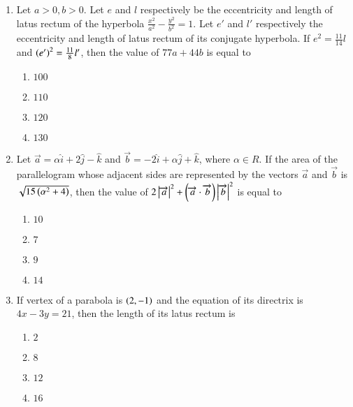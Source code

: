 \documentclass[journal]{IEEEtran}
\begin{document}
\begin{enumerate}
    \item Let $a>0, b>0$. Let $e$ and $l$ respectively be the eccentricity and length of latus rectum of the hyperbola $\frac{x^2}{a^2}-\frac{y^2}{b^2}=1$. Let $e'$ and $l'$ respectively the eccentricity and length of latus rectum of its conjugate hyperbola. If $e^2=\frac{11}{14}l$ and $\left(e'\right)^2=\frac{11}{8}l'$, then the value of $77a+44b$ is equal to

        \begin{multicols}{4}
            \begin{enumerate}
                \item $100$
                \item $110$
                \item $120$
                \item $130$
            \end{enumerate}
        \end{multicols}

    \item Let $\overrightarrow{a}=\alpha \hat{i}+2\hat{j}-\hat{k}$ and $\overrightarrow{b}=-2\hat{i}+\alpha\hat{j}+\hat{k}$, where $\alpha\in R$. If the area of the parallelogram whose adjacent sides are represented by the vectors $\overrightarrow{a}$ and $\overrightarrow{b}$ is $\sqrt{15\left(\alpha^2+4\right)}$, then the value of $2\left\vert\overrightarrow{a}\right\vert^2+\left(\overrightarrow{a}\cdot\overrightarrow{b}\right)\left\vert\overrightarrow{b}\right\vert^2$ is equal to

        \begin{multicols}{4}
            \begin{enumerate}
                \item $10$
                \item $7$
                \item $9$
                \item $14$
            \end{enumerate}
        \end{multicols}

    \item If vertex of a parabola is $\left(2,-1\right)$ and the equation of its directrix is $4x-3y=21$, then the length of its latus rectum is
    
        \begin{multicols}{4}
            \begin{enumerate}
                \item $2$
                \item $8$
                \item $12$
                \item $16$
            \end{enumerate}
        \end{multicols}

\end{enumerate}
\end{document}

